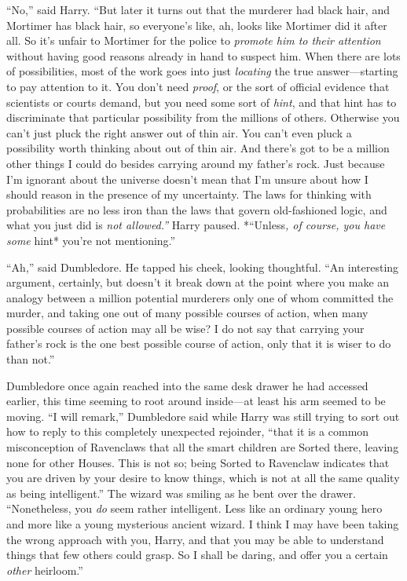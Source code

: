 ``No,'' said Harry. ``But later it turns out that the murderer had black
hair, and Mortimer has black hair, so everyone's like, ah, looks like
Mortimer did it after all. So it's unfair to Mortimer for the police to
\emph{promote him to their attention} without having good reasons
already in hand to suspect him. When there are lots of possibilities,
most of the work goes into just \emph{locating} the true
answer---starting to pay attention to it. You don't need \emph{proof},
or the sort of official evidence that scientists or courts demand, but
you need some sort of \emph{hint}, and that hint has to discriminate
that particular possibility from the millions of others. Otherwise you
can't just pluck the right answer out of thin air. You can't even pluck
a possibility worth thinking about out of thin air. And there's got to
be a million other things I could do besides carrying around my father's
rock. Just because I'm ignorant about the universe doesn't mean that I'm
unsure about how I should reason in the presence of my uncertainty. The
laws for thinking with probabilities are no less iron than the laws that
govern old-fashioned logic, and what you just did is \emph{not
allowed.''} Harry paused. *``Unless\emph{, of course, you have some
}hint* you're not mentioning.''

``Ah,'' said Dumbledore. He tapped his cheek, looking thoughtful. ``An
interesting argument, certainly, but doesn't it break down at the point
where you make an analogy between a million potential murderers only one
of whom committed the murder, and taking one out of many possible
courses of action, when many possible courses of action may all be wise?
I do not say that carrying your father's rock is the one best possible
course of action, only that it is wiser to do than not.''

Dumbledore once again reached into the same desk drawer he had accessed
earlier, this time seeming to root around inside---at least his arm
seemed to be moving. ``I will remark,'' Dumbledore said while Harry was
still trying to sort out how to reply to this completely unexpected
rejoinder, ``that it is a common misconception of Ravenclaws that all
the smart children are Sorted there, leaving none for other Houses. This
is not so; being Sorted to Ravenclaw indicates that you are driven by
your desire to know things, which is not at all the same quality as
being intelligent.'' The wizard was smiling as he bent over the drawer.
``Nonetheless, you \emph{do} seem rather intelligent. Less like an
ordinary young hero and more like a young mysterious ancient wizard. I
think I may have been taking the wrong approach with you, Harry, and
that you may be able to understand things that few others could grasp.
So I shall be daring, and offer you a certain \emph{other} heirloom.''

